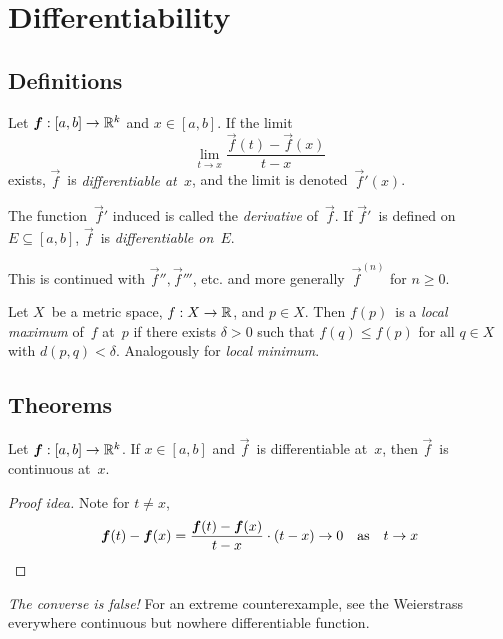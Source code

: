 %
%
%
\section{Differentiability}

\subsection*{Definitions}
\begin{defn}
Let \(\vec{f}:[a,b]\to\R^k\) and \(x\in[a,b]\). If the limit
\[\lim_{t\to x}\frac{\vec{f}(t)-\vec{f}(x)}{t-x}\]
exists, \(\vec{f}\)~is \emph{differentiable at~\(x\)}, and the limit is denoted~\(\vec{f}'(x)\).

The function~\(\vec{f}'\) induced is called the \emph{derivative} of~\(\vec{f}\). If \(\vec{f}'\)~is defined on \(E\subseteq[a,b]\), \(\vec{f}\)~is \emph{differentiable on~\(E\)}.

This is continued with \(\vec{f}'',\vec{f}'''\), etc. and more generally~\(\vec{f}^{(n)}\) for \(n\ge 0\).
\end{defn}

\begin{defn}
Let \(X\)~be a metric space, \(f:X\to\R\), and \(p\in X\). Then \(f(p)\)~is a \emph{local maximum} of~\(f\) at~\(p\) if there exists \(\delta>0\) such that \(f(q)\le f(p)\) for all \(q\in X\) with \(d(p,q)<\delta\). Analogously for \emph{local minimum}.
\end{defn}

\subsection*{Theorems}
\begin{thm}
Let \(\vec{f}:[a,b]\to\R^k\). If \(x\in[a,b]\) and \(\vec{f}\)~is differentiable at~\(x\), then \(\vec{f}\)~is continuous at~\(x\).
\end{thm}
\begin{proof}[Proof idea]
Note for \(t\ne x\),
\begin{equation*}
\vec{f}(t)-\vec{f}(x)=\frac{\vec{f}(t)-\vec{f}(x)}{t-x}\cdot(t-x)\to 0\quad\text{as}\quad t\to x\qedhere
\end{equation*}
\end{proof}
\begin{rmk}
\emph{The converse is false!} For an extreme counterexample, see the Weierstrass everywhere continuous but nowhere differentiable function.
\end{rmk}

